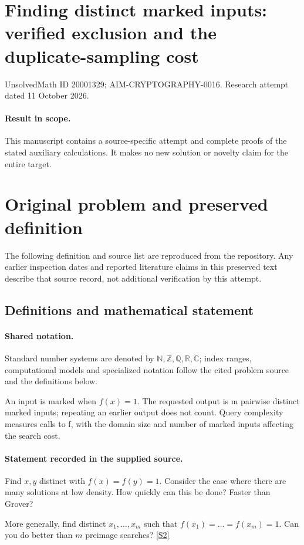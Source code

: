\documentclass[11pt]{article}
\begin{document}
\section*{Finding distinct marked inputs: verified exclusion and the duplicate-sampling cost}
\noindent UnsolvedMath ID 20001329; AIM-CRYPTOGRAPHY-0016. Research attempt dated 11 October 2026.
\paragraph{Result in scope.}This manuscript contains a source-specific attempt and complete proofs of the stated auxiliary calculations. It makes no new solution or novelty claim for the entire target.
\section{Original problem and preserved definition}
The following definition and source list are reproduced from the repository. Any earlier inspection dates and reported literature claims in this preserved text describe that source record, not additional verification by this attempt.
\subsection{Definitions and mathematical statement}

\paragraph{Shared notation.}Standard number systems are denoted by $\mathbb N,\mathbb Z,\mathbb Q,\mathbb R,\mathbb C$; index ranges, computational models and specialized notation follow the cited problem source and the definitions below.


An input is marked when $f(x)=1$. The requested output is m pairwise distinct marked inputs; repeating an earlier output does not count. Query complexity measures calls to f, with the domain size and number of marked inputs affecting the search cost.
\paragraph{Statement recorded in the supplied source.}
Find $x,y$ distinct with $f(x) = f(y) = 1$. Consider the case where there are many solutions at low density. How quickly can this be done? Faster than Grover?

More generally, find distinct $x_1,\dots, x_m$ such that $f(x_1) = \dots = f(x_m) = 1$. Can you do better than $m$ preimage searches? \href{http://aimpl.org/quantumalg/2/}{[S2]}
\end{document}

